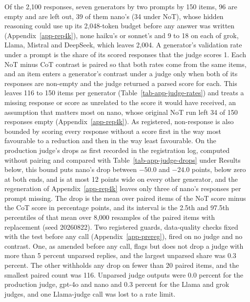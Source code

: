 Of the 2,100 responses, seven generators by two prompts by 150 items, 96 are
empty and are left out, 39 of them nano's (34 under NoT), whose hidden
reasoning could use up its 2,048-token budget before any answer was written
(Appendix~\ref{app-rep4k}), none haiku's or sonnet's and 9 to 18 on each of
grok, Llama, Mistral and DeepSeek, which leaves 2,004.
A generator's validation rate under a prompt is the share of its scored
responses that the judge scores 1. Each NoT minus CoT contrast is paired so
that both rates come from the same items, and an item enters a generator's
contrast under a judge only when both of its responses are non-empty and the
judge returned a parsed score for each. This leaves 116 to 150 items per
generator (Table~\ref{tab-app-judge-rates}) and treats a missing response or
score as unrelated to the score it would have received, an assumption that
matters most on nano, whose original NoT run left 34 of 150 responses empty
(Appendix~\ref{app-rep4k}).
As registered, non-response is also bounded by scoring every response without
a score first in the way most favourable to a reduction and then in the way
least favourable. On the production judge's drops as first recorded in the
registration log, computed without pairing and compared with
Table~\ref{tab-app-judge-drops} under Results below, this bound puts nano's drop between $-50.0$ and $-24.0$
points, below zero at both ends, and is at most 12 points wide on every other
generator, and the regeneration of Appendix~\ref{app-rep4k} leaves only three
of nano's responses per prompt missing.
The drop is the mean over paired items of the NoT score minus the CoT score
in percentage points, and its interval is the 2.5th and 97.5th percentiles
of that mean over 8,000 resamples of the paired items with replacement (seed
20260822). Two registered guards, data-quality checks fixed with the test
before any call (Appendix~\ref{app-prereg}), fired on no judge and no
contrast. One, as amended before any call, flags but does not drop a judge
with more than 5 percent unparsed replies, and the largest unparsed share was
0.3 percent. The other withholds any drop on fewer than 20 paired items, and
the smallest paired count was 116. Unparsed judge outputs were 0.0 percent for
the production judge, gpt-4o and nano and 0.3 percent for the Llama and grok judges, and
one Llama-judge call was lost to a rate limit.

